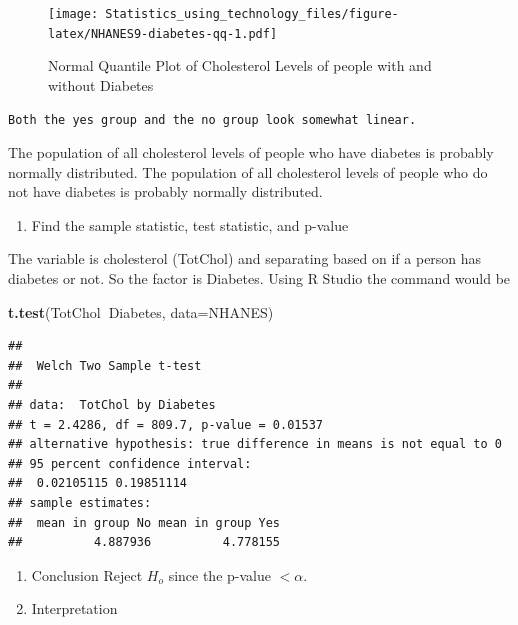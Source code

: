 \documentclass[]{book}
\newenvironment{Shaded}{\begin{snugshade}}{\end{snugshade}}
\newcommand{\DataTypeTok}[1]{\textcolor[rgb]{0.13,0.29,0.53}{#1}}
\newcommand{\KeywordTok}[1]{\textcolor[rgb]{0.13,0.29,0.53}{\textbf{#1}}}
\newcommand{\NormalTok}[1]{#1}
\newcommand{\OperatorTok}[1]{\textcolor[rgb]{0.81,0.36,0.00}{\textbf{#1}}}
\providecommand{\tightlist}{%
  \setlength{\itemsep}{0pt}\setlength{\parskip}{0pt}}
\begin{document}
\begin{figure}
\centering
\texttt{[image: Statistics\_using\_technology\_files/figure-latex/NHANES9-diabetes-qq-1.pdf]}
\caption{\label{fig:NHANES9-diabetes-qq}Normal Quantile Plot of Cholesterol Levels of people with and without Diabetes}
\end{figure}

\begin{verbatim}
Both the yes group and the no group look somewhat linear.
\end{verbatim}

The population of all cholesterol levels of people who have diabetes is probably normally distributed. The population of all cholesterol levels of people who do not have diabetes is probably normally distributed.

\begin{enumerate}
\def\labelenumi{\arabic{enumi}.}
\setcounter{enumi}{3}
\tightlist
\item
  Find the sample statistic, test statistic, and p-value
\end{enumerate}

The variable is cholesterol (TotChol) and separating based on if a person has diabetes or not. So the factor is Diabetes. Using R Studio the command would be

\begin{Shaded}
\begin{Highlighting}[]
\KeywordTok{t.test}\NormalTok{(TotChol}\OperatorTok{~}\NormalTok{Diabetes, }\DataTypeTok{data=}\NormalTok{NHANES)}
\end{Highlighting}
\end{Shaded}

\begin{verbatim}
## 
##  Welch Two Sample t-test
## 
## data:  TotChol by Diabetes
## t = 2.4286, df = 809.7, p-value = 0.01537
## alternative hypothesis: true difference in means is not equal to 0
## 95 percent confidence interval:
##  0.02105115 0.19851114
## sample estimates:
##  mean in group No mean in group Yes 
##          4.887936          4.778155
\end{verbatim}

\begin{enumerate}
\def\labelenumi{\arabic{enumi}.}
\setcounter{enumi}{4}
\item
  Conclusion
  Reject \(H_o\) since the p-value \(<\alpha\).
\item
  Interpretation
\end{enumerate}
\end{document}
